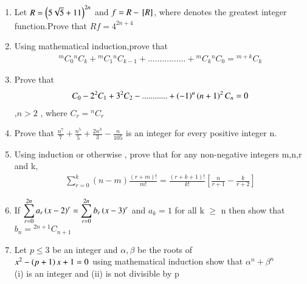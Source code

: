 \documentclass[journal,12pt,twocolumn]{IEEEtran}
\theoremstyle{remark}
\begin{document}
\begin{enumerate}
	    \item Let $ R =\left(5\sqrt{5}+11\right)^{2n} $ and $ f = R -{}\left[R\right] $, where \sbrak denotes the greatest integer function.Prove  that $ Rf =4^{2n+4 } $  \hfill {}


	    \item Using mathematical induction,prove that
		    \begin{align*} {}^mC_0{}^nC_k +{}^mC_1{}^nC_{k-1}+................+{}^mC_k{}^nC_0 ={}^{m+k}C_k \end{align*}  \hfill {}


	    \item Prove that \hfill{}
		    \begin{align*} 
		    C_0-2^2C_1+3^2C_2-............+\left(-1\right)^n\left(n+1\right)^2C_n =0
		    \end{align*},$n>2$ , where $C_r={}^nC_r$
		    

	    \item Prove that   $ \frac{n^7}{7}+\frac{n^5}{5}+\frac{2n^3}{3}-\frac{n}{105}$ is an integer for every positive integer n. \hfill{}


	    \item Using induction or otherwise , prove that for any non-negative integers m,n,r and k,
		    \begin{align*} 
			    \sum_{r=0}^{k}(n-m)\frac{(r+m)!}{m!}= \frac{(r+k+1)!}{k!}[\frac{n}{r+1}-\frac{k}{r+2}]
		    \end{align*}
		     \hfill{} 

	    \item If $ \displaystyle\sum_{r=0}^{2n} a_r \left(x-2\right)^r=\displaystyle\sum_{r=0}^{2n}b_r \left(x-3\right)^r $ and $ a_k =1 $ for all k $\geq $ n then show that $ b_n = {}^{2n+1}C_{n+1} $ \hfill {}

	    \item Let $ p \leq 3 $ be an integer and $ \alpha , \beta $ be  the roots of\\ $ x^2-\left(p+1\right)x+1=0 $ using mathematical induction show that $ \alpha^n  + \beta^n $\\ (i) is an integer and   
		        (ii) is not divisible by p       \hfill{}
		    
 \end{enumerate}
    
    
\end{document}
